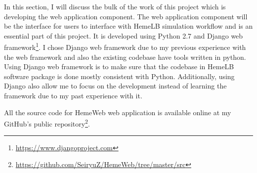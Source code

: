 In this section, I will discuss the bulk of the work of this project which is developing the web application component. The web application component will be the interface for users to interface with HemeLB simulation workflow and is an essential part of this project. It is developed using Python 2.7 and Django web framework\footnote{\url{https://www.djangoproject.com}}. I chose Django web framework due to my previous experience with the web framework and also the existing codebase have tools written in python. Using Django web framework is to make sure that the codebase in HemeLB software package is done mostly consistent with Python. Additionally, using Django also allow me to focus on the development instead of learning the framework due to my past experience with it.

All the source code for HemeWeb web application is available online at my GitHub's public repository\footnote{\url{https://github.com/SeiryuZ/HemeWeb/tree/master/src}}.



